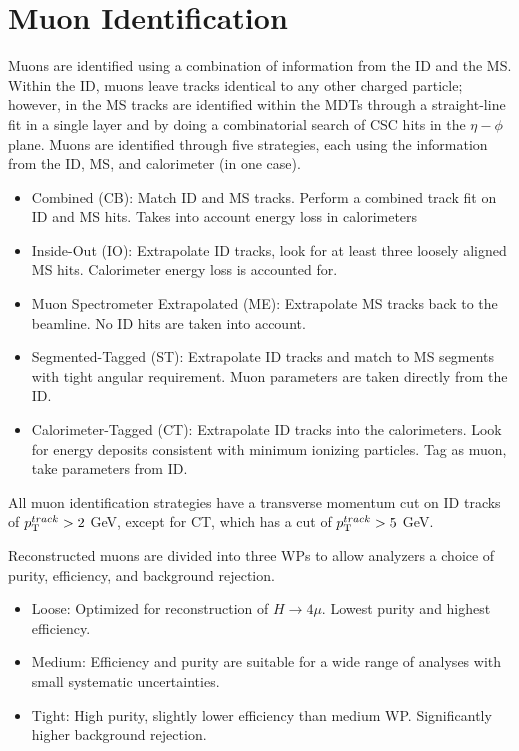 	\section{Muon Identification}\label{sec:reco-muon}
	Muons are identified using a combination of information from the ID and the MS. Within the ID, muons leave tracks identical to any other charged particle; however, in the MS tracks are identified within the MDTs through a straight-line fit in a single layer and by doing a combinatorial search of CSC hits in the $\eta-\phi$ plane. \cite{muon-id} Muons are identified through five strategies, each using the information from the ID, MS, and calorimeter (in one case).
	\begin{itemize}
		\item Combined (CB): Match ID and MS tracks. Perform a combined track fit on ID and MS hits. Takes into account energy loss in calorimeters
		\item Inside-Out (IO): Extrapolate ID tracks, look for at least three loosely aligned MS hits. Calorimeter energy loss is accounted for.
		\item Muon Spectrometer Extrapolated (ME): Extrapolate MS tracks back to the beamline. No ID hits are taken into account.
		\item Segmented-Tagged (ST): Extrapolate ID tracks and match to MS segments with tight angular requirement. Muon parameters are taken directly from the ID.
		\item Calorimeter-Tagged (CT): Extrapolate ID tracks into the calorimeters. Look for energy deposits consistent with minimum ionizing particles. Tag as muon, take parameters from ID.
	\end{itemize}
	All muon identification strategies have a transverse momentum cut on ID tracks of $p_{\text{T}}^{track}> 2$ GeV, except for CT, which has a cut of $p_{\text{T}}^{track} > 5$ GeV.
	
	Reconstructed muons are divided into three WPs to allow analyzers a choice of purity, efficiency, and background rejection. 
	\begin{itemize}
		\item Loose: Optimized for reconstruction of $H\rightarrow4\mu$. Lowest purity and highest efficiency.
		\item Medium: Efficiency and purity are suitable for a wide range of analyses with small systematic uncertainties.
		\item Tight: High purity, slightly lower efficiency than medium WP. Significantly higher background rejection.
	\end{itemize}


